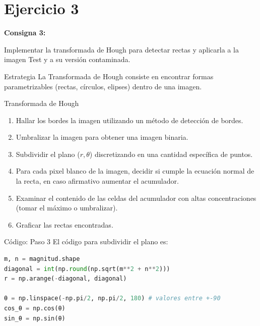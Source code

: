 \documentclass{beamer}
\begin{document}
\section{Ejercicio 3}

\begin{frame}
	\begin{center}
		\textcolor{unahurverde}{\textbf{Consigna 3:}}
	\end{center}
	\justifying
	 Implementar la transformada de Hough para detectar rectas y aplicarla a la imagen Test y a su versión contaminada.
\end{frame}

\begin{frame}[fragile]{Estrategia}
	\justifying
	La Transformada de Hough consiste en encontrar formas parametrizables (rectas, círculos, elipses) dentro de una imagen.
	\begin{block}{Transformada de Hough}
		\begin{enumerate}
			\item Hallar los bordes la imagen utilizando un método de detección de bordes.
			\item Umbralizar la imagen para obtener una imagen binaria.
			\item Subdividir el plano ($r, \theta$) discretizando en una cantidad específica de puntos.
			\item Para cada pixel blanco de la imagen, decidir si cumple la ecuación normal de la recta, en caso afirmativo aumentar el acumulador.
			\item Examinar el contenido de las celdas del acumulador con altas concentraciones (tomar el máximo o umbralizar).
			\item Graficar las rectas encontradas.
		\end{enumerate}
	\end{block}
\end{frame}

\begin{frame}[fragile]{Código: Paso 3}
	\justifying
	El código para subdividir el plano es:
	\begin{lstlisting}[language=Python]
m, n = magnitud.shape
diagonal = int(np.round(np.sqrt(m**2 + n**2)))
r = np.arange(-diagonal, diagonal)

θ = np.linspace(-np.pi/2, np.pi/2, 180) # valores entre +-90
cos_θ = np.cos(θ)
sin_θ = np.sin(θ)
	\end{lstlisting}
\end{frame}
\end{document}
